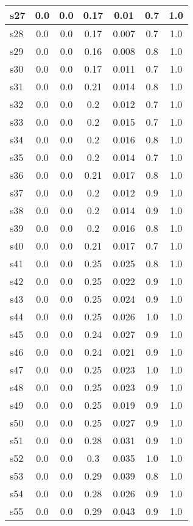\documentclass{article}
\begin{document}
\begin{tabular}{|l|c|c|c|c|c|c|}
\hline
s27 &0.0 & 0.0 & 0.17 & 0.01 & 0.7 & 1.0\\
\hline
s28 &0.0 & 0.0 & 0.17 & 0.007 & 0.7 & 1.0\\
\hline
s29 &0.0 & 0.0 & 0.16 & 0.008 & 0.8 & 1.0\\
\hline
s30 &0.0 & 0.0 & 0.17 & 0.011 & 0.7 & 1.0\\
\hline
s31 &0.0 & 0.0 & 0.21 & 0.014 & 0.8 & 1.0\\
\hline
s32 &0.0 & 0.0 & 0.2 & 0.012 & 0.7 & 1.0\\
\hline
s33 &0.0 & 0.0 & 0.2 & 0.015 & 0.7 & 1.0\\
\hline
s34 &0.0 & 0.0 & 0.2 & 0.016 & 0.8 & 1.0\\
\hline
s35 &0.0 & 0.0 & 0.2 & 0.014 & 0.7 & 1.0\\
\hline
s36 &0.0 & 0.0 & 0.21 & 0.017 & 0.8 & 1.0\\
\hline
s37 &0.0 & 0.0 & 0.2 & 0.012 & 0.9 & 1.0\\
\hline
s38 &0.0 & 0.0 & 0.2 & 0.014 & 0.9 & 1.0\\
\hline
s39 &0.0 & 0.0 & 0.2 & 0.016 & 0.8 & 1.0\\
\hline
s40 &0.0 & 0.0 & 0.21 & 0.017 & 0.7 & 1.0\\
\hline
s41 &0.0 & 0.0 & 0.25 & 0.025 & 0.8 & 1.0\\
\hline
s42 &0.0 & 0.0 & 0.25 & 0.022 & 0.9 & 1.0\\
\hline
s43 &0.0 & 0.0 & 0.25 & 0.024 & 0.9 & 1.0\\
\hline
s44 &0.0 & 0.0 & 0.25 & 0.026 & 1.0 & 1.0\\
\hline
s45 &0.0 & 0.0 & 0.24 & 0.027 & 0.9 & 1.0\\
\hline
s46 &0.0 & 0.0 & 0.24 & 0.021 & 0.9 & 1.0\\
\hline
s47 &0.0 & 0.0 & 0.25 & 0.023 & 1.0 & 1.0\\
\hline
s48 &0.0 & 0.0 & 0.25 & 0.023 & 0.9 & 1.0\\
\hline
s49 &0.0 & 0.0 & 0.25 & 0.019 & 0.9 & 1.0\\
\hline
s50 &0.0 & 0.0 & 0.25 & 0.027 & 0.9 & 1.0\\
\hline
s51 &0.0 & 0.0 & 0.28 & 0.031 & 0.9 & 1.0\\
\hline
s52 &0.0 & 0.0 & 0.3 & 0.035 & 1.0 & 1.0\\
\hline
s53 &0.0 & 0.0 & 0.29 & 0.039 & 0.8 & 1.0\\
\hline
s54 &0.0 & 0.0 & 0.28 & 0.026 & 0.9 & 1.0\\
\hline
s55 &0.0 & 0.0 & 0.29 & 0.043 & 0.9 & 1.0\\

\end{tabular}
\end{document}
